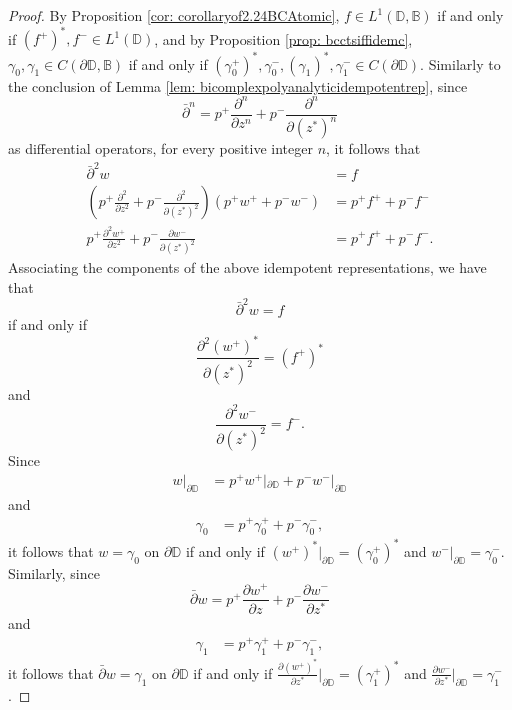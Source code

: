 \documentclass[12pt,reqno]{amsart}
\theoremstyle{definition}
\theoremstyle{remark}
\newcommand{\p}{\partial}
\newcommand{\dbar}{\bar\partial}
\newcommand{\bc}{\mathbb{B}}
\newcommand{\disk}{\mathbb{D}}
\begin{document}
            \begin{proof}
                By Proposition \ref{cor: corollaryof2.24BCAtomic}, $f \in L^1(\disk,\bc)$ if and only if $(f^+)^*, f^- \in L^1(\disk)$, and by Proposition \ref{prop: bcctsiffidemc}, $\gamma_0,\gamma_1 \in C(\p\disk,\bc)$ if and only if $(\gamma_0^+)^*,\gamma_0^-, (\gamma_1)^*, \gamma_1^- \in C(\p\disk)$. Similarly to the conclusion of Lemma \ref{lem: bicomplexpolyanalyticidempotentrep}, since 
                \[
                    \dbar^n = p^+ \frac{\p^n}{\p z^n} + p^- \frac{\p^n}{\p (z^*)^n}
                \]
                as differential operators, for every positive integer $n$, it follows that 
                \begin{align*}
                    \dbar^2 w &= f\\
                    \left(p^+ \frac{\p^2}{\p z^2} + p^- \frac{\p^2}{\p (z^*)^2}\right)(p^+ w^+ + p^- w^-) &= p^+ f^+ + p^- f^-\\
                    p^+ \frac{\p^2 w^+}{\p z^2} + p^- \frac{\p w^-}{\p (z^*)^2} &= p^+ f^+ + p^- f^-.
                \end{align*}
                Associating the components of the above idempotent representations, we have that 
                \[
                    \dbar^2 w = f
                \]
                if and only if
                \[
                    \frac{\p^2 (w^+)^*}{\p (z^*)^2} = (f^+)^*
                \]
                and
                \[
                    \frac{\p^2 w^-}{\p (z^*)^2} = f^-.
                \]
                Since 
                \begin{align*}
                    w|_{\p\disk} &= p^+ w^+|_{\p\disk} + p^- w^-|_{\p\disk} 
                \end{align*}
                and
                \begin{align*}
                    \gamma_0 &= p^+ \gamma_0^+ + p^- \gamma_0^-,
                \end{align*}
                it follows that $w= \gamma_0$ on $\p\disk$ if and only if $(w^+)^*|_{\p\disk} = (\gamma_0^+)^*$ and $w^-|_{\p\disk} = \gamma_0^-$. Similarly, since 
                \[
                    \dbar w = p^+ \frac{\p w^+}{\p z} + p^- \frac{\p w^-}{\p z^*}
                \]
                and 
                \begin{align*}
                    \gamma_1 &= p^+ \gamma_1^+ + p^- \gamma_1^-,
                \end{align*}
                it follows that $\dbar w = \gamma_1$ on $\p\disk$ if and only if $\frac{\p (w^+)^*}{\p z^*}|_{\p\disk} = (\gamma_1^+)^*$ and $\frac{\p w^-}{\p z^*}|_{\p\disk} = \gamma_1^-$. 
            \end{proof}
\end{document}
